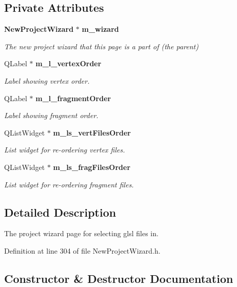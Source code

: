 \subsection*{Private Attributes}
\begin{DoxyCompactItemize}
\item 
{\bf New\-Project\-Wizard} $\ast$ {\bf m\-\_\-wizard}
\begin{DoxyCompactList}\small\item\em The new project wizard that this page is a part of (the parent) \end{DoxyCompactList}\item 
Q\-Label $\ast$ {\bf m\-\_\-l\-\_\-vertex\-Order}
\begin{DoxyCompactList}\small\item\em Label showing vertex order. \end{DoxyCompactList}\item 
Q\-Label $\ast$ {\bf m\-\_\-l\-\_\-fragment\-Order}
\begin{DoxyCompactList}\small\item\em Label showing fragment order. \end{DoxyCompactList}\item 
Q\-List\-Widget $\ast$ {\bf m\-\_\-ls\-\_\-vert\-Files\-Order}
\begin{DoxyCompactList}\small\item\em List widget for re-\/ordering vertex files. \end{DoxyCompactList}\item 
Q\-List\-Widget $\ast$ {\bf m\-\_\-ls\-\_\-frag\-Files\-Order}
\begin{DoxyCompactList}\small\item\em List widget for re-\/ordering fragment files. \end{DoxyCompactList}\end{DoxyCompactItemize}


\subsection{Detailed Description}
The project wizard page for selecting glsl files in. 

Definition at line 304 of file New\-Project\-Wizard.\-h.



\subsection{Constructor \& Destructor Documentation}
